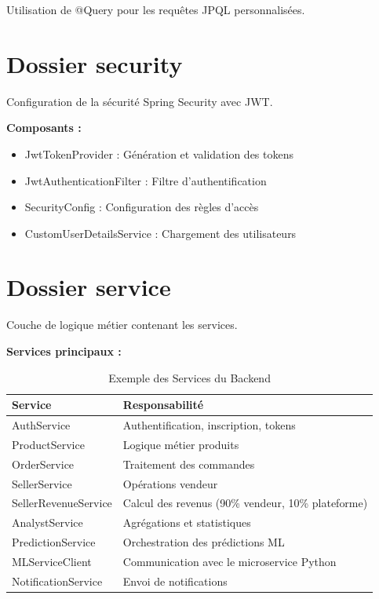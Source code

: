 \documentclass[12pt,a4paper]{report}
\begin{document}
Utilisation de @Query pour les requêtes JPQL personnalisées.

\section{Dossier security}

Configuration de la sécurité Spring Security avec JWT.

\textbf{Composants :}
\begin{itemize}[noitemsep]
    \item JwtTokenProvider : Génération et validation des tokens
    \item JwtAuthenticationFilter : Filtre d'authentification
    \item SecurityConfig : Configuration des règles d'accès
    \item CustomUserDetailsService : Chargement des utilisateurs
\end{itemize}

\section{Dossier service}

Couche de logique métier contenant les services.

\textbf{Services principaux :}

\begin{table}[H]
    \centering
    \caption{Exemple des Services du Backend}
    \begin{tabularx}{\textwidth}{lX}
        \toprule
        \textbf{Service} & \textbf{Responsabilité} \\
        \midrule
        AuthService & Authentification, inscription, tokens \\
        ProductService & Logique métier produits \\
        OrderService & Traitement des commandes \\
        SellerService & Opérations vendeur \\
        SellerRevenueService & Calcul des revenus (90\% vendeur, 10\% plateforme) \\
        AnalystService & Agrégations et statistiques \\
        PredictionService & Orchestration des prédictions ML \\
        MLServiceClient & Communication avec le microservice Python \\
        NotificationService & Envoi de notifications \\
        \bottomrule
    \end{tabularx}
    \label{tab:services}
\end{table}
\end{document}
